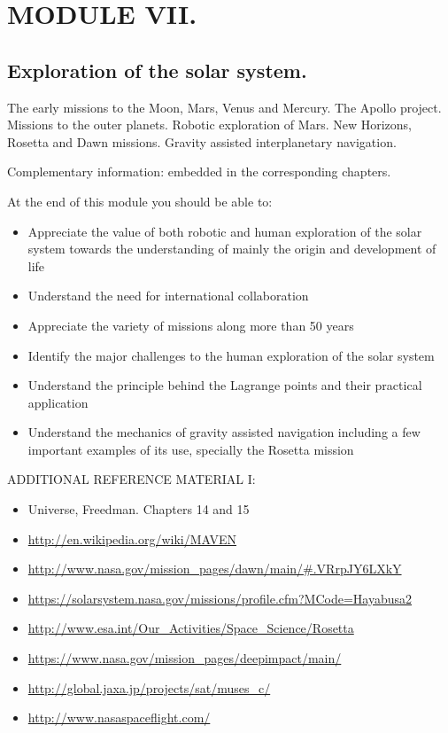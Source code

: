 \section{MODULE VII.}
\subsection{Exploration of the solar system.} 
The early missions to the Moon, Mars, Venus and Mercury. The Apollo project. Missions to the outer planets. Robotic exploration of Mars. New Horizons, Rosetta and Dawn missions. Gravity assisted interplanetary navigation.

Complementary information: embedded in the corresponding chapters.

At the end of this module you should be able to:
\begin{itemize}
\item  Appreciate the value of both robotic and human exploration of the solar system towards the understanding of mainly the origin and development of life
\item Understand the need for international collaboration
\item Appreciate the variety of missions along more than 50 years
\item Identify the major challenges to the human exploration of the solar system
\item Understand the principle behind the Lagrange points and their practical application
\item Understand the mechanics of gravity assisted navigation including a few important examples of its use, specially the Rosetta mission
\end{itemize}

ADDITIONAL REFERENCE MATERIAL I:
\begin{itemize}
\item Universe, Freedman. Chapters 14 and 15
\item \url{http://en.wikipedia.org/wiki/MAVEN}
\item \url{http://www.nasa.gov/mission_pages/dawn/main/#.VRrpJY6LXkY}
\item \url{https://solarsystem.nasa.gov/missions/profile.cfm?MCode=Hayabusa2}
\item \url{http://www.esa.int/Our_Activities/Space_Science/Rosetta}
\item \url{https://www.nasa.gov/mission_pages/deepimpact/main/} 
\item \url{http://global.jaxa.jp/projects/sat/muses_c/}
\item \url{http://www.nasaspaceflight.com/}
\end{itemize}

